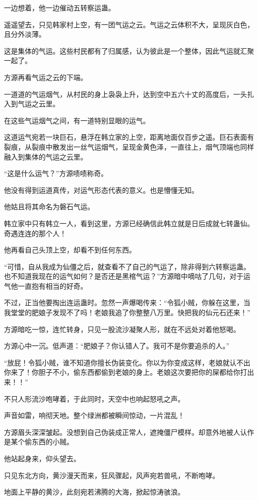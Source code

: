 \begin{this_body}
一边想着，他一边催动五转察运蛊。

遥遥望去，只见韩家村上空，有一团气运之云。气运之云体积不大，呈现灰白色，且分外淡薄。

这是集体的气运。这些村民都有了归属感，认为彼此是一个整体，因此气运就汇聚一起了。

方源再看气运之云的下端。

一道道的气运烟气，从村民的身上袅袅上升，达到空中五六十丈的高度后，一头扎入到气运之云里。

在这些气运烟气之间，有一道特别显眼的运气。

这道运气宛若一块巨石，悬浮在韩立家的上空，距离地面仅百步之遥。巨石表面有裂痕，从裂痕中散发出一丝气运烟气，呈现金黄色泽，一直往上，烟气顶端也同样融入到集体的气运之云里。

“这是什么运气？”方源啧啧称奇。

他没有得到运道真传，对运气形态代表的意义。也是懵懂无知。

他姑且将其命名为磐石气运。

韩立家中只有韩立一人，看到这里，方源已经确信此韩立就是日后成就七转蛊仙。奇遇连连的那个人！

他再看自己头顶上空，却看不到任何东西。

“可惜，自从我成为仙僵之后，就查看不了自己的气运了，除非得到六转察运蛊。也不知道我现在的运气如何？是否还是黑棺气运？”方源暗中嘀咕了几句，对于运气他一直抱有相当的好奇。

不过，正当他要掏出连运蛊时。忽然一声爆喝传来：“令狐小贼，你躲在这里，当我堂堂的肥娘子发现不了吗！老娘我追了你整整八万里。快把我的仙元石还来！”

方源暗吃一惊，连忙转身，只见一股流沙凝聚人形，就在不远处对着他怒喝。

方源心中一沉。低声道：“肥娘子？你认错人了。我可不是你要追杀的人。”

“放屁！令狐小贼，谁不知道你擅长伪装变化。你以为你变成这样，老娘就认不出你来了！你胆子不小，偷东西都偷到老娘的身上。老娘这次要把你的屎都给你打出来！！”

不只人形流沙咆哮着，于此同时，天空中也响起怒吼之声。

声音如雷，响彻天地。整个绿洲都被瞬间惊动，一片混乱！

方源眉头深深皱起。没想到自己伪装成正常人，遮掩僵尸模样。却意外地被人认作是某个偷东西的小贼。

他站起身来，仰头望去。

只见东北方向，黄沙漫天而来，狂风骤起，风声宛若兽吼，不断咆哮。

地面上平静的黄沙，此刻宛若沸腾的大海，掀起惊涛骇浪。


\end{this_body}
